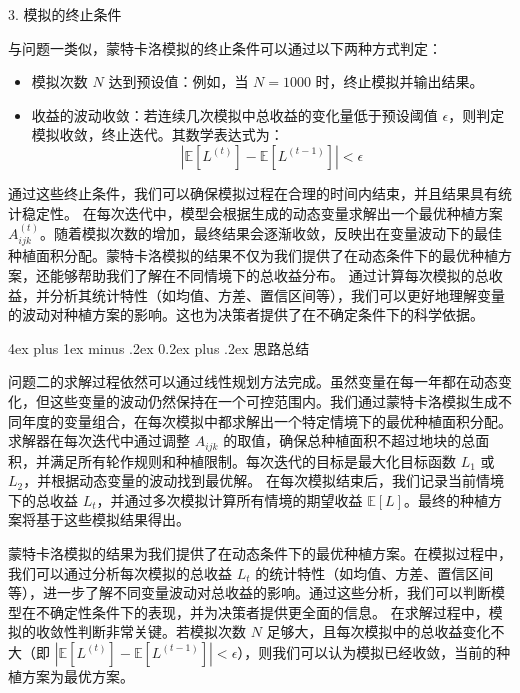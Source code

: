 \documentclass[12pt,a4paper]{nmmcm}
\makeatletter
\renewcommand\subsubsection{\@startsection{subsubsection}{3}{1em}%
  {4ex plus 1ex minus .2ex}%
  {0.2ex plus .2ex}%
  {\normalfont\large\bfseries}}
\makeatother
\begin{document}
 3. 模拟的终止条件

与问题一类似，蒙特卡洛模拟的终止条件可以通过以下两种方式判定：
\begin{itemize}
  \item 模拟次数 $N$ 达到预设值：例如，当 $N=1000$ 时，终止模拟并输出结果。
  \item 收益的波动收敛：若连续几次模拟中总收益的变化量低于预设阈值 $\epsilon$，则判定模拟收敛，终止迭代。其数学表达式为：
  \[
  |\mathbb{E}[L^{(t)}] - \mathbb{E}[L^{(t-1)}]| < \epsilon
  \]
\end{itemize}

通过这些终止条件，我们可以确保模拟过程在合理的时间内结束，并且结果具有统计稳定性。
在每次迭代中，模型会根据生成的动态变量求解出一个最优种植方案 $A_{ijk}^{(t)}$。随着模拟次数的增加，最终结果会逐渐收敛，反映出在变量波动下的最佳种植面积分配。蒙特卡洛模拟的结果不仅为我们提供了在动态条件下的最优种植方案，还能够帮助我们了解在不同情境下的总收益分布。
通过计算每次模拟的总收益，并分析其统计特性（如均值、方差、置信区间等），我们可以更好地理解变量的波动对种植方案的影响。这也为决策者提供了在不确定条件下的科学依据。

\subsubsection{思路总结}

问题二的求解过程依然可以通过线性规划方法完成。虽然变量在每一年都在动态变化，但这些变量的波动仍然保持在一个可控范围内。我们通过蒙特卡洛模拟生成不同年度的变量组合，在每次模拟中都求解出一个特定情境下的最优种植面积分配。
求解器在每次迭代中通过调整 $A_{ijk}$ 的取值，确保总种植面积不超过地块的总面积，并满足所有轮作规则和种植限制。每次迭代的目标是最大化目标函数 $L_1$ 或 $L_2$，并根据动态变量的波动找到最优解。
在每次模拟结束后，我们记录当前情境下的总收益 $L_t$，并通过多次模拟计算所有情境的期望收益 $\mathbb{E}[L]$。最终的种植方案将基于这些模拟结果得出。

蒙特卡洛模拟的结果为我们提供了在动态条件下的最优种植方案。在模拟过程中，我们可以通过分析每次模拟的总收益 $L_t$ 的统计特性（如均值、方差、置信区间等），进一步了解不同变量波动对总收益的影响。通过这些分析，我们可以判断模型在不确定性条件下的表现，并为决策者提供更全面的信息。
在求解过程中，模拟的收敛性判断非常关键。若模拟次数 $N$ 足够大，且每次模拟中的总收益变化不大（即 $|\mathbb{E}[L^{(t)}] - \mathbb{E}[L^{(t-1)}]| < \epsilon$），则我们可以认为模拟已经收敛，当前的种植方案为最优方案。
\end{document}
